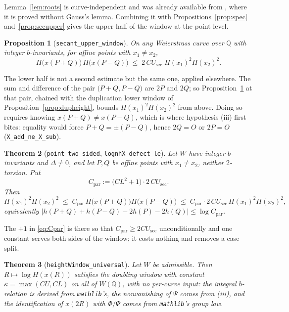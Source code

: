 \documentclass[11pt,reqno]{amsart}
\theoremstyle{plain}
\newtheorem{theorem}{Theorem}[section]
\newtheorem{proposition}[theorem]{Proposition}
\theoremstyle{definition}
\theoremstyle{remark}
\DeclareRobustCommand{\lt}[1]{\texttt{#1}}
\newcommand{\nh}{H}
\begin{document}
Lemma~\ref{lem:roots} is curve-independent and was already available
from \cite{MW}, where it is proved without Gauss's lemma. Combining it
with Propositions~\ref{prop:spec} and~\ref{prop:secupper} gives the
upper half of the window at the point level.

\begin{proposition}[\lt{secant\_upper\_window}]\label{prop:upper}
On any Weierstrass curve over $\mathbb{Q}$ with integer $b$-invariants,
for affine points with $x_1 \ne x_2$,
\[
  \nh\bigl(x(P{+}Q)\bigr)\,\nh\bigl(x(P{-}Q)\bigr)
    \;\le\; 2\,CU_{\mathrm{sec}}\;\nh(x_1)^2\nh(x_2)^2 .
\]
\end{proposition}

The lower half is not a second estimate but the same one, applied
elsewhere. The sum and difference of the pair $\bigl(P{+}Q, P{-}Q\bigr)$
are $2P$ and $2Q$; so Proposition~\ref{prop:upper} at that pair, chained
with the duplication lower window of
Proposition~\ref{prop:dupheight}, bounds
$\nh(x_1)^2\nh(x_2)^2$ from above. Doing so requires knowing
$x(P{+}Q) \ne x(P{-}Q)$, which is where hypothesis (iii) first bites:
equality would force $P{+}Q = \pm(P{-}Q)$, hence $2Q = O$ or $2P = O$
(\lt{X\_add\_ne\_X\_sub}).

\begin{theorem}[\lt{point\_two\_sided}, \lt{lognhX\_defect\_le}]
\label{thm:twosided}
Let $W$ have integer $b$-invariants and $\Delta \ne 0$, and let $P,Q$ be
affine points with $x_1 \ne x_2$, neither $2$-torsion. Put
\begin{equation}\label{eq:Cpar}
  C_{\mathrm{par}} := \bigl(CL^2 + 1\bigr)\cdot
     2\,CU_{\mathrm{sec}} .
\end{equation}
Then
\[
  \nh(x_1)^2\nh(x_2)^2
    \;\le\; C_{\mathrm{par}}\,
      \nh\bigl(x(P{+}Q)\bigr)\nh\bigl(x(P{-}Q)\bigr)
    \;\le\; C_{\mathrm{par}}\cdot 2\,CU_{\mathrm{sec}}\,
      \nh(x_1)^2\nh(x_2)^2,
\]
equivalently
$\bigl\lvert h(P{+}Q) + h(P{-}Q) - 2h(P) - 2h(Q)\bigr\rvert
 \le \log C_{\mathrm{par}}$.
\end{theorem}

The $+1$ in \eqref{eq:Cpar} is there so that
$C_{\mathrm{par}} \ge 2CU_{\mathrm{sec}}$ unconditionally and one
constant serves both sides of the window; it costs nothing and removes a
case split.

\begin{theorem}[\lt{heightWindow\_universal}]\label{thm:windowuniv}
Let $W$ be admissible. Then $R \mapsto \log\nh(x(R))$ satisfies the
doubling window with constant $\kappa = \max(CU,CL)$ on all of
$W(\mathbb{Q})$, with no per-curve input: the integral $b$-relation is
derived from \texttt{mathlib}'s, the nonvanishing of $\Psi$ comes from
(iii), and the identification of $x(2R)$ with $\Phi/\Psi$ comes from
\texttt{mathlib}'s group law.
\end{theorem}
\end{document}
